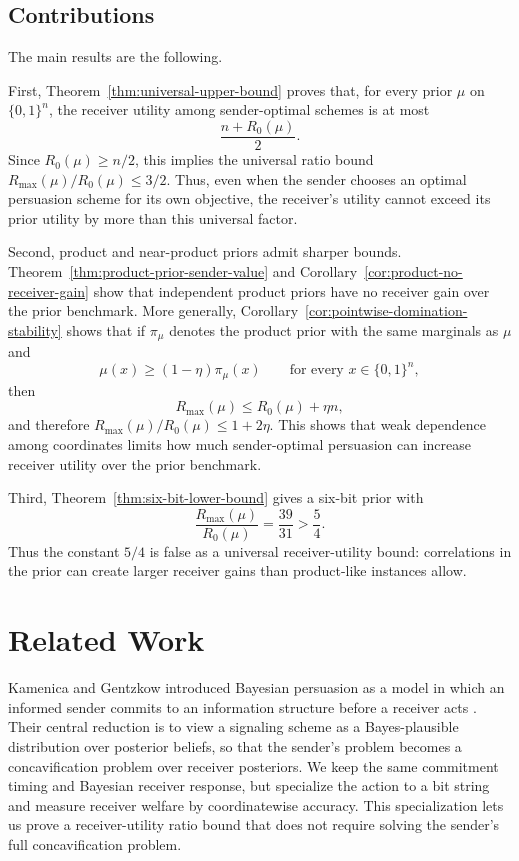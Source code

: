 \documentclass[format=acmsmall, review=false]{acmart}
\begin{document}
\subsection{Contributions}

The main results are the following.

First, Theorem~\ref{thm:universal-upper-bound} proves that, for every prior
$\mu$ on $\{0,1\}^n$, the receiver utility among sender-optimal schemes is at
most
\[
\frac{n+R_0(\mu)}{2}.
\]
Since $R_0(\mu)\geq n/2$, this implies the universal ratio bound
$R_{\max}(\mu)/R_0(\mu)\leq 3/2$. Thus, even when the sender chooses an
optimal persuasion scheme for its own objective, the receiver's utility cannot
exceed its prior utility by more than this universal factor.

Second, product and near-product priors admit sharper bounds.
Theorem~\ref{thm:product-prior-sender-value} and
Corollary~\ref{cor:product-no-receiver-gain} show that independent product
priors have no receiver gain over the prior benchmark. More generally,
Corollary~\ref{cor:pointwise-domination-stability} shows that if $\pi_\mu$
denotes the product prior with the same marginals as $\mu$ and
\[
\mu(x)\geq (1-\eta)\pi_\mu(x)
\qquad\text{for every }x\in\{0,1\}^n,
\]
then
\[
R_{\max}(\mu)\leq R_0(\mu)+\eta n,
\]
and therefore $R_{\max}(\mu)/R_0(\mu)\leq 1+2\eta$. This shows that weak
dependence among coordinates limits how much sender-optimal persuasion can
increase receiver utility over the prior benchmark.

Third, Theorem~\ref{thm:six-bit-lower-bound} gives a six-bit prior with
\[
\frac{R_{\max}(\mu)}{R_0(\mu)}=\frac{39}{31}> \frac54.
\]
Thus the constant $5/4$ is false as a universal receiver-utility bound:
correlations in the prior can create larger receiver gains than product-like
instances allow.

\section{Related Work}

Kamenica and Gentzkow introduced Bayesian persuasion as a model in which an
informed sender commits to an information structure before a receiver acts
\cite{kamenica2011bayesian}. Their central reduction is to view a signaling
scheme as a Bayes-plausible distribution over posterior beliefs, so that the
sender's problem becomes a concavification problem over receiver posteriors. We
keep the same commitment timing and Bayesian receiver response, but specialize
the action to a bit string and measure receiver welfare by coordinatewise
accuracy. This specialization lets us prove a receiver-utility ratio bound that
does not require solving the sender's full concavification problem.
\end{document}
